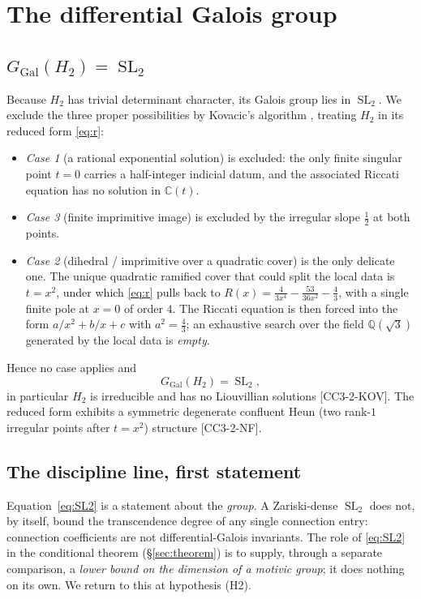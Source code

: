 \documentclass[11pt,reqno]{amsart}
\theoremstyle{plain}
\theoremstyle{definition}
\theoremstyle{remark}
\newcommand{\Q}{\mathbb{Q}}
\newcommand{\C}{\mathbb{C}}
\newcommand{\GGal}{G_{\mathrm{Gal}}}
\newcommand{\SL}{\operatorname{SL}}
\newcommand{\Htwo}{H_{2}}
\newcommand{\claim}[1]{\textsf{\small[#1]}}
\begin{document}
\section{The differential Galois group}\label{sec:galois}

\subsection{$\GGal(\Htwo)=\SL_{2}$}
Because $\Htwo$ has trivial determinant character, its Galois group lies in
$\SL_{2}$. We exclude the three proper possibilities by Kovacic's algorithm
\cite{Kovacic}, treating $\Htwo$ in its reduced form \eqref{eq:r}:
\begin{itemize}
\item \emph{Case 1} (a rational exponential solution) is excluded: the only
finite singular point $t=0$ carries a half-integer indicial datum, and the
associated Riccati equation has no solution in $\C(t)$.
\item \emph{Case 3} (finite imprimitive image) is excluded by the irregular
slope $\tfrac12$ at both points.
\item \emph{Case 2} (dihedral / imprimitive over a quadratic cover) is the only
delicate one. The unique quadratic ramified cover that could split the local
data is $t=x^{2}$, under which \eqref{eq:r} pulls back to
$R(x)=\tfrac{4}{3x^{4}}-\tfrac{53}{36x^{2}}-\tfrac43$, with a single finite pole
at $x=0$ of order $4$. The Riccati equation is then forced into the form
$a/x^{2}+b/x+c$ with $a^{2}=\tfrac43$; an exhaustive search over the field
$\Q(\sqrt3)$ generated by the local data is \emph{empty}.
\end{itemize}
Hence no case applies and
\begin{equation}\label{eq:SL2}
  \GGal(\Htwo)=\SL_{2},
\end{equation}
in particular $\Htwo$ is irreducible and has no Liouvillian solutions
\cite{vdPutSinger} \claim{CC3-2-KOV}. The reduced form exhibits a symmetric
degenerate confluent Heun (two rank-$1$ irregular points after $t=x^{2}$)
structure \claim{CC3-2-NF}.

\subsection{The discipline line, first statement}\label{sec:discipline1}
Equation~\eqref{eq:SL2} is a statement about the \emph{group}. A Zariski-dense
$\SL_{2}$ does not, by itself, bound the transcendence degree of any single
connection entry: connection coefficients are not differential-Galois
invariants. The role of \eqref{eq:SL2} in the conditional theorem
(\S\ref{sec:theorem}) is to supply, through a separate comparison, a
\emph{lower bound on the dimension of a motivic group}; it does nothing on its
own. We return to this at hypothesis (H2).
\end{document}
